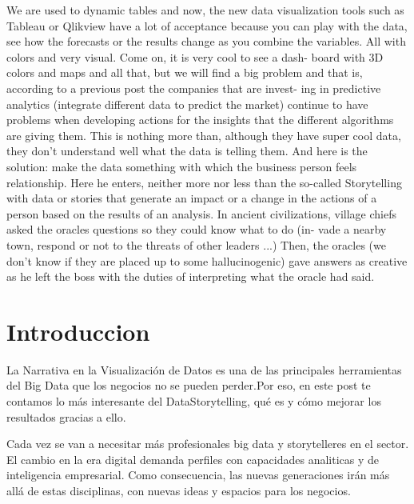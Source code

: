 \documentclass[twoside,twocolumn]{article}
\begin{document}
We are used to dynamic tables and now, the new data visualization tools such as Tableau or Qlikview have a lot of acceptance because you can play with the data, see how the forecasts or the results change as you combine the variables. All with colors and very visual. Come on, it is very cool to see a dash- board with 3D colors and maps and all that,  but we will find a big problem and that is, according to a previous post the companies that are invest- ing in predictive analytics (integrate different data to predict the market) continue to have problems when developing actions for the insights that the different algorithms are giving them.
This is nothing more than, although they have super cool data, they don’t understand well what the data is telling them. And here is the solution: make the data something with which the business person feels relationship. Here he enters, neither more nor less than the so-called Storytelling with data or stories that generate an impact or a change in the actions of a person based on the results of an analysis.
In ancient civilizations, village chiefs asked the oracles questions so they could know what to do (in- vade a nearby town, respond or not to the threats of other leaders ...) Then, the oracles (we don’t know if they are placed up to some hallucinogenic) gave answers as creative as he left the boss with the duties of interpreting what the oracle had said.






\section{Introduccion}
La Narrativa en la Visualización de Datos es una
de las principales herramientas del Big Data que
los negocios no se pueden perder.Por eso, en este
post te contamos lo más interesante del DataStorytelling, qué es y cómo mejorar los resultados
gracias a ello.

Cada vez se van a necesitar más profesionales big data y storytelleres en
el sector. El cambio en la era digital demanda
perfiles con capacidades analiticas y de inteligencia
empresarial. Como consecuencia, las nuevas
generaciones irán más allá de estas disciplinas, con
nuevas ideas y espacios para los negocios.

\begin{center}

\end{center}
\end{document}
